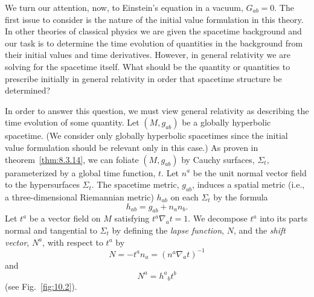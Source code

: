 We turn our attention, now, to Einstein's equation in a vacuum, \(G_{ab}=0\). The first
issue to consider is the nature of the initial value formulation in this theory. In other
theories of classical physics we are given the spacetime background and our task is to
determine the time evolution of quantities in the background from their initial values
and time derivatives. However, in general relativity we are solving for the spacetime
itself. What should be the quantity or quantities to prescribe initially in general
relativity in order that spacetime structure be determined?

In order to answer this question, we must view general relativity as describing the time
evolution of some quantity. Let \((M,g_{ab})\) be a globally hyperbolic spacetime. (We
consider only globally hyperbolic spacetimes since the initial value formulation should
be relevant only in this case.) As proven in theorem~\ref{thm:8.3.14}, we can foliate
\((M,g_{ab})\) by Cauchy surfaces, \(\Sigma_t\), parameterized by a global time
function, \(t\). Let \(n^a\) be the unit normal vector field to the hypersurfaces
\(\Sigma_t\). The spacetime metric, \(g_{ab}\), induces a spatial metric (i.e., a
three-dimensional Riemannian metric) \(h_{ab}\) on each \(\Sigma_t\) by the formula
\begin{equation}
  h_{ab}=g_{ab}+n_an_b.
  \tag{10.2.10}\label{eq:10.2.10}
\end{equation}
Let \(t^a\) be a vector field on \(M\) satisfying \(t^a\nabla_at=1\). We decompose
\(t^a\) into its parts normal and tangential to \(\Sigma_t\) by defining the \emph{lapse
function}, \(N\), and the \emph{shift vector}, \(N^a\), with respect to \(t^a\) by
\begin{equation}
  N=-t^an_a=(n^a\nabla_at)^{-1}
  \tag{10.2.11}\label{eq:10.2.11}
\end{equation}
and
\begin{equation}
  N^a=h^a{}_bt^b
  \tag{10.2.12}\label{eq:10.2.12}
\end{equation}
(see Fig.~\ref{fig:10.2}).



